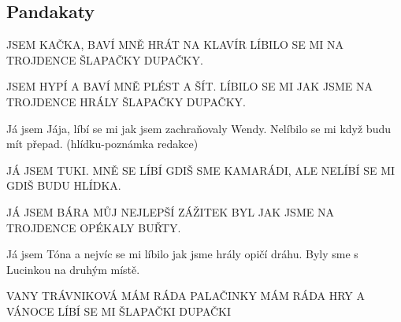 \subsection*{Pandakaty} %
\label{sub:pandakaty}

\begin{multicol}[2]
	

JSEM KAČKA, BAVÍ MNĚ HRÁT NA KLAVÍR
LÍBILO SE MI NA TROJDENCE ŠLAPAČKY DUPAČKY.

JSEM HYPÍ A BAVÍ MNĚ PLÉST A ŠÍT.
LÍBILO SE MI JAK JSME NA TROJDENCE HRÁLY ŠLAPAČKY DUPAČKY.

Já jsem Jája, líbí se mi jak jsem zachraňovaly Wendy. Nelíbilo se mi když budu mít přepad. (hlídku-poznámka redakce)
\podpo

JÁ JSEM TUKI. MNĚ SE LÍBÍ GDIŠ SME KAMARÁDI, ALE NELÍBÍ SE MI GDIŠ BUDU HLÍDKA.

JÁ JSEM BÁRA
MŮJ NEJLEPŠÍ ZÁŽITEK BYL JAK JSME NA TROJDENCE OPÉKALY BUŘTY.


Já jsem Tóna a nejvíc se mi líbilo jak jsme hrály opičí dráhu. Byly sme s Lucinkou na druhým místě.


VANY TRÁVNIKOVÁ
MÁM RÁDA PALAČINKY 
MÁM RÁDA HRY A VÁNOCE 
LÍBÍ SE MI ŠLAPAČKI DUPAČKI
\end{multicol}

